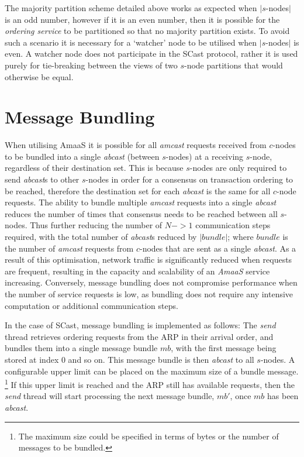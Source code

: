     The majority partition scheme detailed above works as expected when $|s$-nodes$|$ is an odd number, however if it is an even number, then it is possible for the \emph{ordering service} to be partitioned so that no majority partition exists.  To avoid such a scenario it is necessary for a \textquoteleft{}watcher' node to be utilised when $|s$-nodes$|$ is even.  A watcher node does not participate in the \textsf{SCast} protocol, rather it is used purely for tie-breaking between the views of two $s$-node partitions that would otherwise be equal.  

\section{Message Bundling}\label{ssec:abaas_optimisations}
		When utilising \textsf{AmaaS} it is possible for all \emph{amcast} requests received from $c$-nodes to be bundled into a single \emph{abcast} (between $s$-nodes) at a receiving $s$-node, regardless of their destination set.  This is because $s$-nodes are only required to send \emph{abcast}s to other $s$-nodes in order for a consensus on transaction ordering to be reached, therefore the destination set for each \emph{abcast} is the same for all $c$-node requests.   The ability to bundle multiple \emph{amcast} requests into a single \emph{abcast} reduces the number of times that consensus needs to be reached between all $s$-nodes.  Thus further reducing the number of $N->1$ communication steps required, with the total number of \emph{abcast}s reduced by $\left\vert bundle \right\vert$; where $bundle$ is the number of  \emph{amcast} requests from $c$-nodes that are sent as a single \emph{abcast}.  As a result of this optimisation, network traffic is significantly reduced when requests are frequent, resulting in the capacity and scalability of an \emph{AmaaS} service increasing. Conversely, message bundling does not compromise performance when the number of service requests is low, as bundling does not require any intensive computation or additional communication steps.  
    
    In the case of \textsf{SCast}, message bundling is implemented as follows: The \emph{send} thread retrieves ordering requests from the ARP in their arrival order, and bundles them into a single message bundle $mb$, with the first message being stored at index 0 and so on.  This message bundle is then \emph{abcast} to all $s$-nodes.  A configurable upper limit can be placed on the maximum size of a bundle message. \footnote{The maximum size could be specified in terms of bytes or the number of messages to be bundled.} If this upper limit is reached and the ARP still has available requests, then the \emph{send} thread will start processing the next message bundle, $mb'$, once $mb$ has been \emph{abcast}.  
    

